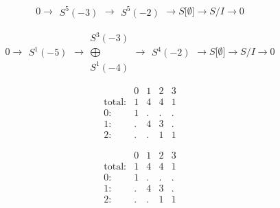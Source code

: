 \documentclass[12pt,a3paper,landscape]{amsart}
\numberwithin{equation}{section}
\theoremstyle{plain}
\theoremstyle{definition}
\begin{document}
$$
0 \rightarrow \begin{matrix}
S^{5}(-3)
\end{matrix}
\rightarrow \begin{matrix}
S^{5}(-2)
\end{matrix}
\rightarrow S \lbrack \emptyset \rbrack \rightarrow S/I \rightarrow 0
$$

$$
0 \rightarrow \begin{matrix}
S^{1}(-5)
\end{matrix}
\rightarrow\begin{matrix}
S^{3}(-3)\\ \bigoplus \\
S^{1}(-4)
\end{matrix}
\rightarrow\begin{matrix}
S^{4}(-2)
\end{matrix}
\rightarrow S \lbrack \emptyset \rbrack \rightarrow S/I \rightarrow 0
$$


$$
\begin{matrix}
 		& 0 & 1 & 2 & 3 \\
 \text{total}: & 1 & 4 & 4 & 1 \\
 0:		& 1 & . & . & . \\
 1:		& . & 4 & 3 & . \\
 2:		& . & . & 1 & 1
\end{matrix}
$$

$$
\begin{matrix}
& 0 & 1 & 2 & 3 \\
\text{total}: & 1 & 4 & 4 & 1 \\
0: & 1 & . & . & . \\
1: & . & 4 & 3 & . \\
2: & . & . & 1 & 1
\end{matrix}
$$
\end{document}
